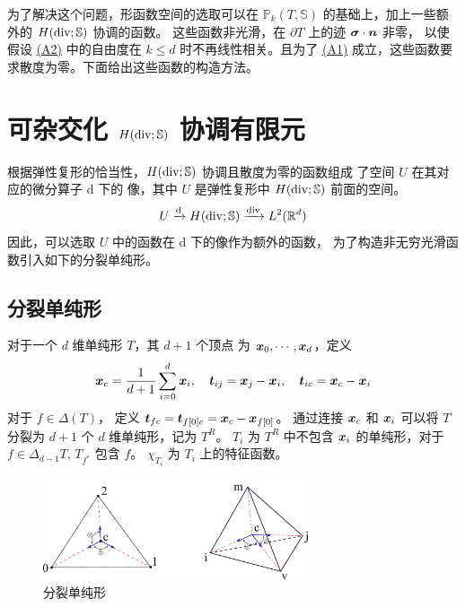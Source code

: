 \documentclass[letterpaper,12pt]{article}
\begin{document}
%
为了解决这个问题，形函数空间的选取可以在 $\mathbb{P}_k(T,
\mathbb{S})$ 的基础上，加上一些额外的 $H(\operatorname{div}; \mathbb{S})$ 协调的函数。
这些函数非光滑，在 $\partial T$ 上的迹 $\boldsymbol{\sigma} \cdot \boldsymbol{n}$ 非零，
以使假设 \hyperref[assumption2]{(A2)} 中的自由度在 $k \leq d$ 时不再线性相关。且为了
\hyperref[assumption1]{(A1)}
成立，这些函数要求散度为零。下面给出这些函数的构造方法。

\section{可杂交化 $H(\operatorname{div}; \mathbb{S})$ 协调有限元}
根据弹性复形的恰当性，$H(\operatorname{div}; \mathbb{S})$ 协调且散度为零的函数组成
了空间 $U$ 在其对应的微分算子 $\mathrm{d}$ 下的
像，其中 $U$ 是弹性复形中 $H(\operatorname{div}; \mathbb{S})$ 前面的空间。
\begin{equation}
    \label{eq:hilbertcomplex}
    U \xrightarrow{\mathrm{d}} H(\operatorname{div}; \mathbb{S})
    \xrightarrow{\mathrm{div}} L^2(\mathbb{R}^d)
\end{equation}
因此，可以选取 $U$ 中的函数在 $\mathrm{d}$ 下的像作为额外的函数，
为了构造非无穷光滑函数引入如下的分裂单纯形。
\subsection{分裂单纯形}
对于一个 $d$ 维单纯形 $T$，其 $d+1$ 个顶点
为 $\boldsymbol{x}_0, \cdots, \boldsymbol{x}_d$，定义 
$$
\boldsymbol{x}_c = \frac{1}{d+1}\sum_{i=0}^d \boldsymbol{x}_i, \quad
\boldsymbol{t}_{ij} = \boldsymbol{x}_j - \boldsymbol{x}_i, \quad \boldsymbol{t}_{ic} =
\boldsymbol{x}_c - \boldsymbol{x}_i
$$
对于 $f \in \Delta(T)$，
定义 $\boldsymbol{t}_{fc} = \boldsymbol{t}_{f[0]c} = \boldsymbol{x}_c - \boldsymbol{x}_{f[0]}$。
通过连接 $\boldsymbol{x}_c$ 和 $\boldsymbol{x}_i$ 可以将 $T$ 分裂为 $d+1$ 个 $d$ 维单纯形，记为
$T^R$。
$T_i$ 为 $T^R$ 中不包含 $\boldsymbol{x}_i$ 的单纯形，对于 $f \in \Delta_{d-1} T$, $T_{f^*}$
包含 $f$。
$\chi_{T_i}$ 为 $T_i$ 上的特征函数。
\begin{figure}[h]
\centering
\includegraphics[width=0.7\textwidth]{./figures/splite_cell.pdf}
\caption{分裂单纯形}
\end{figure}
\end{document}
